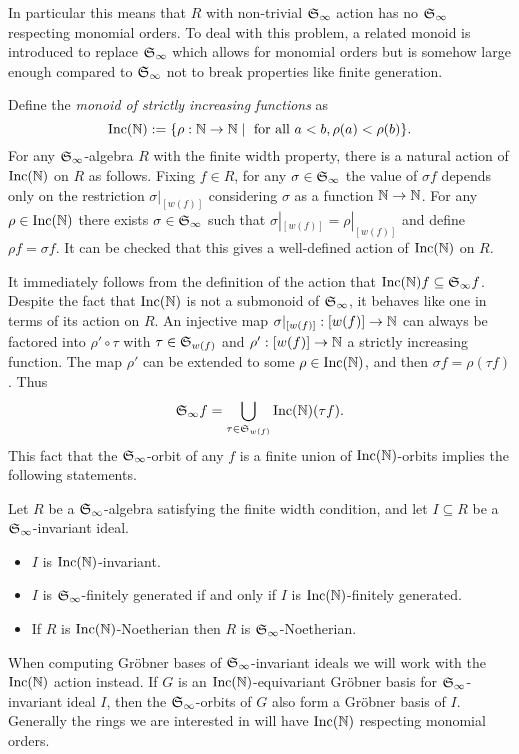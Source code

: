 In particular this means that $R$ with non-trivial $\mathfrak S_\infty$ action has no $\mathfrak S_\infty$ respecting monomial orders.  To deal with this problem, a related monoid is introduced to replace $\mathfrak S_\infty$ which allows for monomial orders but is somehow large enough compared to $\mathfrak S_\infty$ not to break properties like finite generation.

Define the {\em monoid of strictly increasing functions} as
\[ \operatorname{Inc}(\mathbb N) := \{ \rho:\mathbb N \to \mathbb N \mid \text{ for all } a < b, \rho(a) < \rho(b) \}. \]
For any $\mathfrak S_\infty$-algebra $R$ with the finite width property, there is a natural action of $\operatorname{Inc}(\mathbb N)$ on $R$ as follows.  Fixing $f \in R$, for any $\sigma \in \mathfrak S_\infty$ the value of $\sigma f$ depends only on the restriction $\sigma|_{[w(f)]}$ considering $\sigma$ as a function $\mathbb N \to \mathbb N$.  For any $\rho \in \operatorname{Inc}(\mathbb N)$ there exists $\sigma \in \mathfrak S_\infty$ such that $\sigma|_{[w(f)]} = \rho|_{[w(f)]}$ and define $\rho f = \sigma f$.  It can be checked that this gives a well-defined action of $\operatorname{Inc}(\mathbb N)$ on $R$.

It immediately follows from the definition of the action that $\operatorname{Inc}(\mathbb N) f \subseteq \mathfrak S_\infty f$.  Despite the fact that $\operatorname{Inc}(\mathbb N)$ is not a submonoid of $\mathfrak S_\infty$, it behaves like one in terms of its action on $R$.  An injective map $\sigma|_{[w(f)]}: [w(f)] \to \mathbb N$ can always be factored into $\rho' \circ \tau$ with $\tau \in \mathfrak S_{w(f)}$ and $\rho':[w(f)] \to \mathbb N$ a strictly increasing function.  The map $\rho'$ can be extended to some $\rho \in \operatorname{Inc}(\mathbb N)$, and then $\sigma f = \rho (\tau f)$.  Thus
 \[ \mathfrak S_\infty f = \bigcup_{\tau \in \mathfrak S_{w(f)}} \operatorname{Inc}(\mathbb N)(\tau f). \]
This fact that the $\mathfrak S_\infty$-orbit of any $f$ is a finite union of $\operatorname{Inc}(\mathbb N)$-orbits implies the following statements.

\begin{proposition}
 Let $R$ be a $\mathfrak S_\infty$-algebra satisfying the finite width condition, and let $I\subseteq R$ be a $\mathfrak S_\infty$-invariant ideal.
 \begin{itemize}
  \item $I$ is $\operatorname{Inc}(\mathbb N)$-invariant.
  \item $I$ is $\mathfrak S_\infty$-finitely generated if and only if $I$ is $\operatorname{Inc}(\mathbb N)$-finitely generated.
  \item If $R$ is $\operatorname{Inc}(\mathbb N)$-Noetherian then $R$ is $\mathfrak S_\infty$-Noetherian.
 \end{itemize}
\end{proposition}

When computing Gr\"obner bases of $\mathfrak S_\infty$-invariant ideals we will work with the $\operatorname{Inc}(\mathbb N)$ action instead.  If $G$ is an $\operatorname{Inc}(\mathbb N)$-equivariant Gr\"obner basis for $\mathfrak S_\infty$-invariant ideal $I$, then the $\mathfrak S_\infty$-orbits of $G$ also form a Gr\"obner basis of $I$.  Generally the rings we are interested in will have $\operatorname{Inc}(\mathbb N)$ respecting monomial orders.


